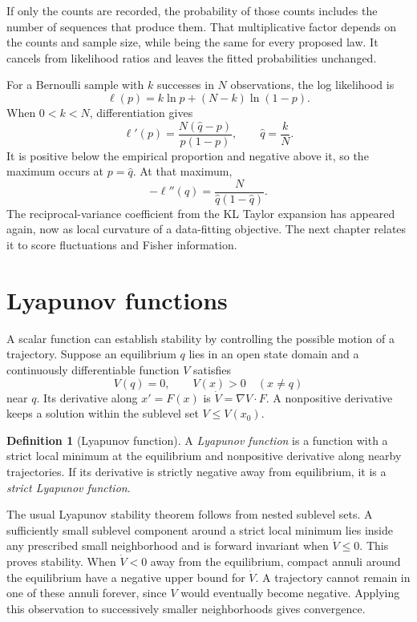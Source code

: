 \documentclass[11pt,oneside,openany]{book}
\theoremstyle{definition}
\newtheorem{definition}[theorem]{Definition}
\theoremstyle{remark}
\numberwithin{equation}{chapter}
\begin{document}
If only the counts are recorded, the probability of those counts includes the number of sequences that produce them. That multiplicative factor depends on the counts and sample size, while being the same for every proposed law. It cancels from likelihood ratios and leaves the fitted probabilities unchanged.

For a Bernoulli sample with $k$ successes in $N$ observations, the log likelihood is
\[
\ell(p)=k\ln p+(N-k)\ln(1-p).
\]
When $0<k<N$, differentiation gives
\[
\ell'(p)=\frac{N(\widehat q-p)}{p(1-p)},\qquad \widehat q=\frac{k}{N}.
\]
It is positive below the empirical proportion and negative above it, so the maximum occurs at $p=\widehat q$. At that maximum,
\[
-\ell''(\widehat q)=\frac{N}{\widehat q(1-\widehat q)}.
\]
The reciprocal-variance coefficient from the KL Taylor expansion has appeared again, now as local curvature of a data-fitting objective. The next chapter relates it to score fluctuations and Fisher information.

\section{Lyapunov functions}
A scalar function can establish stability by controlling the possible motion of a trajectory. Suppose an equilibrium $q$ lies in an open state domain and a continuously differentiable function $V$ satisfies
\[
V(q)=0,\qquad V(x)>0\quad(x\ne q)
\]
near $q$. Its derivative along $x'=F(x)$ is $\dot V=\nabla V\cdot F$. A nonpositive derivative keeps a solution within the sublevel set $V\leq V(x_0)$.

\begin{definition}[Lyapunov function]
A \emph{Lyapunov function} is a function with a strict local minimum at the equilibrium and nonpositive derivative along nearby trajectories. If its derivative is strictly negative away from equilibrium, it is a \emph{strict Lyapunov function}.
\end{definition}

The usual Lyapunov stability theorem follows from nested sublevel sets. A sufficiently small sublevel component around a strict local minimum lies inside any prescribed small neighborhood and is forward invariant when $\dot V\leq0$. This proves stability. When $\dot V<0$ away from the equilibrium, compact annuli around the equilibrium have a negative upper bound for $\dot V$. A trajectory cannot remain in one of these annuli forever, since $V$ would eventually become negative. Applying this observation to successively smaller neighborhoods gives convergence.
\end{document}
